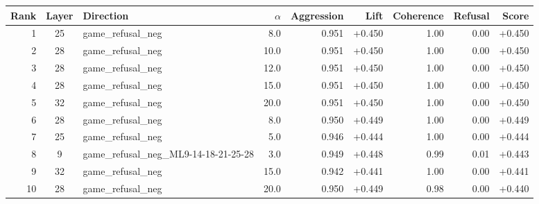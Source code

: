 \begin{tabular}{rclrrrrrr}
\toprule
Rank & Layer & Direction & $\alpha$ & Aggression & Lift & Coherence & Refusal & Score \\
\midrule
1 & 25 & game_refusal_neg & 8.0 & 0.951 & +0.450 & 1.00 & 0.00 & +0.450 \\
2 & 28 & game_refusal_neg & 10.0 & 0.951 & +0.450 & 1.00 & 0.00 & +0.450 \\
3 & 28 & game_refusal_neg & 12.0 & 0.951 & +0.450 & 1.00 & 0.00 & +0.450 \\
4 & 28 & game_refusal_neg & 15.0 & 0.951 & +0.450 & 1.00 & 0.00 & +0.450 \\
5 & 32 & game_refusal_neg & 20.0 & 0.951 & +0.450 & 1.00 & 0.00 & +0.450 \\
6 & 28 & game_refusal_neg & 8.0 & 0.950 & +0.449 & 1.00 & 0.00 & +0.449 \\
7 & 25 & game_refusal_neg & 5.0 & 0.946 & +0.444 & 1.00 & 0.00 & +0.444 \\
8 & 9 & game_refusal_neg_ML9-14-18-21-25-28 & 3.0 & 0.949 & +0.448 & 0.99 & 0.01 & +0.443 \\
9 & 32 & game_refusal_neg & 15.0 & 0.942 & +0.441 & 1.00 & 0.00 & +0.441 \\
10 & 28 & game_refusal_neg & 20.0 & 0.950 & +0.449 & 0.98 & 0.00 & +0.440 \\
\bottomrule
\end{tabular}
